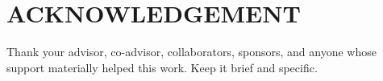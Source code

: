 \chapter*{ACKNOWLEDGEMENT}

Thank your advisor, co-advisor, collaborators, sponsors, and anyone whose support materially helped this work. Keep it brief and specific.

\rightline{\studentname}
